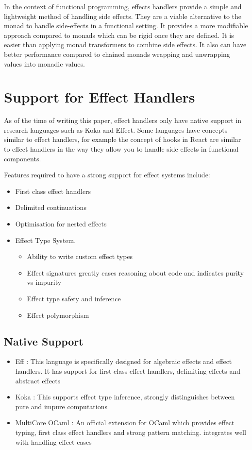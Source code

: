 \documentclass[logo,bsc,singlespacing,parskip]{infthesis}
\begin{document}
In the context of functional programming, effects handlers provide a simple and lightweight method of handling side effects. They are a viable alternative to the monad to handle side-effects in a functional setting. It provides a more modifiable approach compared to monads which can be rigid once they are defined. It is easier than applying monad transformers to combine side effects. It also can have better performance compared to chained monads wrapping and unwrapping values into monadic values.

\section{Support for Effect Handlers}

As of the time of writing this paper, effect handlers only have native support in research languages such as Koka and Effect. Some languages have concepts similar to effect handlers, for example the concept of hooks in React are similar to effect handlers in the way they allow you to handle side effects in functional components. 

Features required to have a strong support for effect systems include: 
\begin{itemize}
    \item First class effect handlers
    \item Delimited continuations
    \item Optimisation for nested effects 
    \item Effect Type System. 
    \begin{itemize}
        \item Ability to write custom effect types 
        \item Effect signatures greatly eases reasoning about code and indicates purity vs impurity
        \item Effect type safety and inference
        \item Effect polymorphism


    \end{itemize}
    
\end{itemize}
 
\subsection{Native Support}

\begin{itemize}
    \item Eff \cite{eff_effects}: This language is specifically designed for algebraic effects and effect handlers. It has support for first class effect handlers, delimiting effects and abstract effects
    \item Koka \cite{koka_effects}: This supports effect type inference, strongly distinguishes between pure and impure computations
    \item MultiCore OCaml \cite{ocaml_effects}: An official extension for OCaml which provides effect typing, first class effect handlers and strong pattern matching. integrates well with handling effect cases
\end{itemize}
\end{document}
